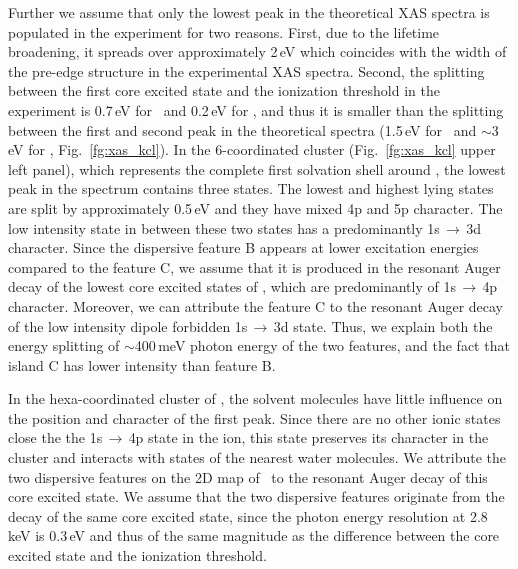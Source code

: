 Further we assume that only the lowest peak in the theoretical XAS spectra is populated in the experiment for two reasons. First, due to the lifetime broadening, it spreads over approximately 2\,eV which coincides with the width of the pre-edge structure in the experimental XAS spectra. Second, the splitting between the first core excited state and the ionization threshold in the experiment is 0.7\,eV for \ki~and 0.2\,eV for \cli, and thus it is smaller than the splitting between the first and second peak in the theoretical spectra (1.5\,eV for \ki~and $\sim$3\,eV for \cli, Fig.\ \ref{fg:xas_kcl}). In the 6-coordinated cluster (Fig.\ \ref{fg:xas_kcl} upper left panel), which represents the complete first solvation shell around \ki, the lowest peak in the spectrum contains three states. The lowest and highest lying states are split by approximately 0.5\,eV and they have mixed 4p and 5p character. The low intensity state in between these two states has a predominantly 1s$\,\rightarrow\,$3d character. Since the dispersive feature B appears at lower excitation energies compared to the feature C, we assume that it is produced in the resonant Auger decay of the lowest core excited states of \ki, which are predominantly of 1s$\,\rightarrow\,$4p character. Moreover, we can attribute the feature C to the resonant Auger decay of the low intensity dipole forbidden 1s$\,\rightarrow\,$3d state. Thus, we explain both the energy splitting of $\sim$400\,meV photon energy of the two features, and the fact that island C has lower intensity than feature B.


In the hexa-coordinated cluster of \cli, the solvent molecules have little influence on the position and character of the first peak. Since there are no other ionic states close the the 1s$\,\rightarrow\,$4p state in the ion, this state preserves its character in the cluster and interacts with states of the nearest water molecules. We attribute the two dispersive features on the 2D map of \cli~to the resonant Auger decay of this core excited state. {\color{red}%
We assume that the two dispersive features originate from the decay of the same core excited state, since the photon energy resolution at 2.8\,keV is 0.3\,eV and thus of the same magnitude as the difference between the core excited state and the ionization threshold.
}


